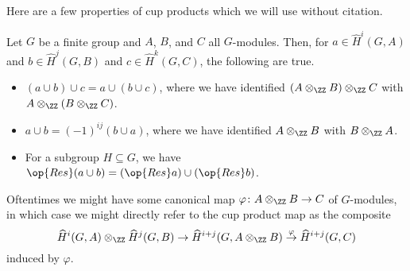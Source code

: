 Here are a few properties of cup products which we will use without citation.
\begin{proposition}
	Let $G$ be a finite group and $A$, $B$, and $C$ all $G$-modules. Then, for $a\in\widehat H^i(G,A)$ and $b\in\widehat H^j(G,B)$ and $c\in\widehat H^k(G,C)$, the following are true.
	\begin{itemize}
		\item $(a\cup b)\cup c=a\cup(b\cup c)$, where we have identified $(A\otimes_\ZZ B)\otimes_\ZZ C$ with $A\otimes_\ZZ(B\otimes_\ZZ C)$.
		\item $a\cup b=(-1)^{ij}(b\cup a)$, where we have identified $A\otimes_\ZZ B$ with $B\otimes_\ZZ A$.
		\item For a subgroup $H\subseteq G$, we have $\op{Res}(a\cup b)=(\op{Res}a)\cup(\op{Res}b)$.
	\end{itemize}
\end{proposition}
\begin{remark}
	Oftentimes we might have some canonical map $\varphi\colon A\otimes_\ZZ B\to C$ of $G$-modules, in which case we might directly refer to the cup product map as the composite
	\[\widehat H^i(G,A)\otimes_\ZZ\widehat H^j(G,B)\to\widehat H^{i+j}(G,A\otimes_\ZZ B)\stackrel\varphi\to\widehat H^{i+j}(G,C)\]
	induced by $\varphi$.
\end{remark}

